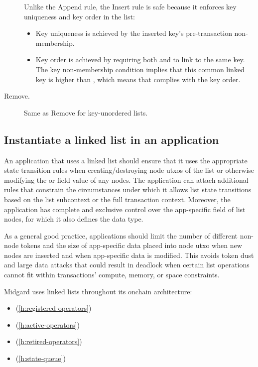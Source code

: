 \documentclass[../midgard.tex]{subfiles}
\begin{document}
\begin{description}
        Unlike the Append rule, the Insert rule is safe because it enforces key uniqueness and key order in the list:
        \begin{itemize}
            \item Key uniqueness is achieved by the inserted key's pre-transaction non-membership.
            \item Key order is achieved by requiring both  and  to link to the same key.
              The key non-membership condition implies that this common linked key is higher than , which means that  complies with the key order.
        \end{itemize}
    \item[Remove.] Same as Remove for key-unordered lists.
\end{description}

\subsection{Instantiate a linked list in an application}
\label{h:instantiate-list-in-application}

An application that uses a linked list should ensure that it uses the appropriate state transition rules when creating/destroying node utxos of the list or otherwise modifying the  or  field value of any nodes.
The application can attach additional rules that constrain the circumstances under which it allows list state transitions based on the list subcontext or the full transaction context.
Moreover, the application has complete and exclusive control over the app-specific  field of list nodes, for which it also defines the data type.

As a general good practice, applications should limit the number of different non-node tokens and the size of app-specific data placed into node utxo when new nodes are inserted and when app-specific data is modified.
This avoids token dust and large data attacks that could result in deadlock when certain list operations cannot fit within transactions' compute, memory, or space constraints.

Midgard uses linked lists throughout its onchain architecture:
\begin{itemize}
    \item {} (\cref{h:registered-operators})
    \item {} (\cref{h:active-operators})
    \item {} (\cref{h:retired-operators})
    \item {} (\cref{h:state-queue})
\end{itemize}
\end{document}
